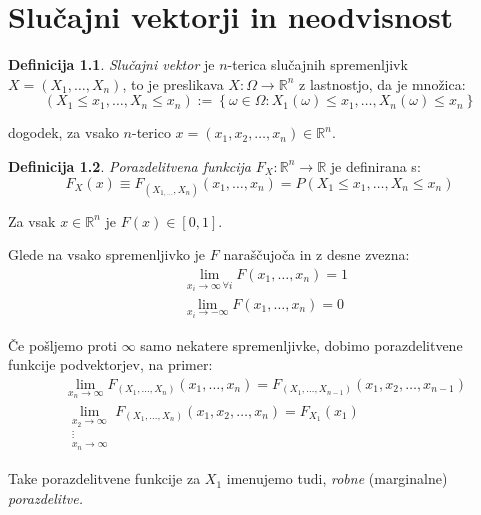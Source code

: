 \documentclass[12pt]{book}
\def\n{\noindent}
\theoremstyle{definition}
\newtheorem{definicija}{Definicija}
\theoremstyle{plain}
\theoremstyle{plain}
\theoremstyle{plain}
\theoremstyle{remark}
\edef\x{\pgfmathresult}%
\begin{document}
\chapter{Slučajni vektorji in neodvisnost}

\begin{definicija}
    \emph{Slučajni vektor} je $n$-terica slučajnih spremenljivk $X=\left(X_1, \ldots, X_n\right)$, to je preslikava $X:\Omega \to \mathbb{R}^n$ z lastnostjo, da je množica: 
    $$
    \left(X_1 \leq x_1, \ldots, X_n \leq x_n\right):=\left\{\omega \in \Omega: X_1(\omega) \leq x_1,\ldots, X_n(\omega) \leq x_n\right\}
    $$

    dogodek, za vsako $n$-terico $x=\left(x_1, x_2, \ldots, x_n\right) \in \mathbb{R}^n$.
\end{definicija}

\begin{definicija}
    \emph{Porazdelitvena funkcija} $F_X: \mathbb{R}^n \to \mathbb{R}$ je definirana s:
    $$
    F_X(x) \equiv F_{\left(X_{1, \ldots}, X_n\right)}\left(x_1, \ldots, x_n\right)=P\left(X_1 \leq x_1, \ldots, X_n \leq x_n\right)
    $$
\end{definicija}

\n Za vsak $x \in \mathbb{R}^n$ je $F(x) \in[0, 1]$.

\n Glede na vsako spremenljivko je $F$ naraščujoča in z desne zvezna:
$$
\begin{aligned}
    &\lim _{x_i \to \infty \, \forall i} F\left(x_1, \ldots, x_n\right)=1 \\
    &\lim _{x_i \rightarrow-\infty} F\left(x_1, \ldots, x_n\right)=0
\end{aligned}
$$

\n Če pošljemo proti $\infty$ samo nekatere spremenljivke, dobimo porazdelitvene funkcije podvektorjev, na primer:
$$
\begin{aligned}
    &\lim _{x_n \to \infty} F_{\left(X_1, \ldots, X_{n}\right)}\left(x_1, \dots , x_n\right)=F_{\left(X_1, \ldots, X_{n-1}\right)}\left(x_1, x_2, \ldots, x_{n-1}\right) \\
    &\lim _{\substack{x_2 \to \infty \\ \vdots \\x_n \to \infty}} F_{\left(X_1, \ldots, X_{n}\right)}\left(x_1, x_2, \ldots, x_n\right)=F_{X_1}\left(x_1\right)
\end{aligned}
$$

Take porazdelitvene funkcije za $X_1$ imenujemo tudi, \emph{robne} (marginalne) \emph{porazdelitve.}
\end{document}
